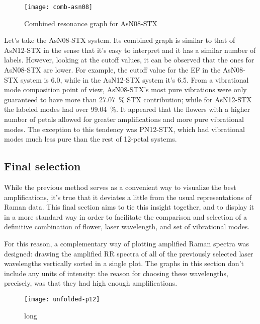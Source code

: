 \begin{figure}
    \texttt{[image: comb-asn08]}
    \caption[Combined resonance graph for AsN08-STX]{Combined resonance graph for AsN08-STX}
\end{figure}

Let's take the AsN08-STX system.
Its combined graph is similar to that of AsN12-STX in the sense that it's easy to interpret and it has a similar number of labels.
However, looking at the cutoff values, it can be observed that the ones for AsN08-STX are lower.
For example, the cutoff value for the EF in the AsN08-STX system is \num{6.0}, while in the AsN12-STX system it's \num{6.5}.
From a vibrational mode composition point of view, AsN08-STX's most pure vibrations were only guaranteed to have more than \SI{27.07}{\percent} STX contribution; while for AsN12-STX the labeled modes had over \SI{99.04}{\percent}.
It appeared that the flowers with a higher number of petals allowed for greater amplifications and more pure vibrational modes.
The exception to this tendency was PN12-STX, which had vibrational modes much less pure than the rest of 12-petal systems.

\subsection{Final selection}
While the previous method serves as a convenient way to visualize the best amplifications, it's true that it deviates a little from the usual representations of Raman data.
This final section aims to tie this insight together, and to display it in a more standard way in order to facilitate the comparison and selection of a definitive combination of flower, laser wavelength, and set of vibrational modes.

For this reason, a complementary way of plotting amplified Raman spectra was designed: drawing the amplified RR spectra of all of the previously selected laser wavelengths vertically sorted in a single plot.
The graphs in this section don't include any units of intensity: the reason for choosing these wavelengths, precisely, was that they had high enough amplifications.

\begin{figure*}[h]
    \texttt{[image: unfolded-p12]}
    \caption[short]{long}
\end{figure*}

